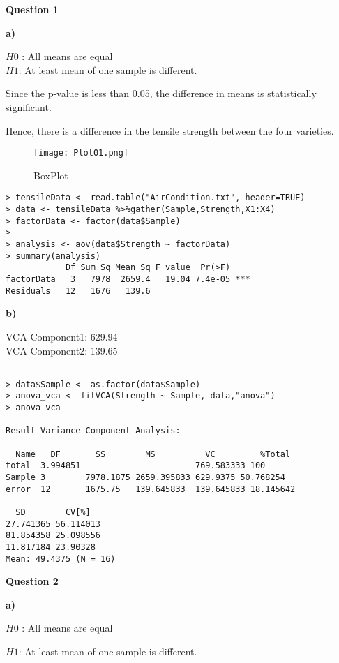 \documentclass[12pt,letterpaper]{article}
\begin{document}
{\Large {\textbf{Question 1}}}

\textbf{{a)} }

$H0$ : All means are equal  \\
$H1$: At least mean of one sample is different.

Since the p-value is less than 0.05, the difference in means is statistically significant.

Hence, there is a difference in the tensile strength between the four varieties.

\begin{figure}[!h]
   \centering
    \texttt{[image: Plot01.png]}
    \caption{BoxPlot}
    \end{figure}

\begin{lstlisting}[label=R Code,caption=Q1(a) R Code Output]
> tensileData <- read.table("AirCondition.txt", header=TRUE)
> data <- tensileData %>%gather(Sample,Strength,X1:X4)
> factorData <- factor(data$Sample)
> 
> analysis <- aov(data$Strength ~ factorData)
> summary(analysis)
            Df Sum Sq Mean Sq F value  Pr(>F)    
factorData   3   7978  2659.4   19.04 7.4e-05 ***
Residuals   12   1676   139.6                    
\end{lstlisting}
\textbf{{b)} }

VCA Component1: 629.94\\
VCA Component2: 139.65\\
\begin{lstlisting}[label=R Code,caption=Q1(b) R Code Output]

> data$Sample <- as.factor(data$Sample)
> anova_vca <- fitVCA(Strength ~ Sample, data,"anova")
> anova_vca

Result Variance Component Analysis:

  Name   DF       SS        MS          VC         %Total   
total  3.994851                       769.583333 100       
Sample 3        7978.1875 2659.395833 629.9375 50.768254
error  12       1675.75   139.645833  139.645833 18.145642  

  SD        CV[%]   
27.741365 56.114013
81.854358 25.098556
11.817184 23.90328
Mean: 49.4375 (N = 16) 
\end{lstlisting}

{\Large {\textbf{Question 2}}}

\textbf{{a)}}

$H0$ : All means are equal

$H1$: At least mean of one sample is different.
\end{document}
